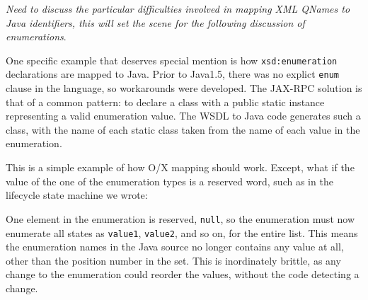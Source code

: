 \emph{Need to discuss the particular difficulties involved in mapping
XML QNames to Java identifiers, this will set the scene for the
following discussion of enumerations}.

One specific example that deserves special mention is how
\verb$xsd:enumeration$ declarations are mapped to Java. Prior to
Java1.5, there was no explict \verb$enum$ clause in the language, so
workarounds were developed. The JAX-RPC solution is that of a common
pattern: to declare a class with a public static instance representing
a valid enumeration value. The WSDL to Java code generates such a
class, with the name of each static class taken from the name of each
value in the enumeration.

This is a simple example of how O/X mapping should work. Except, what if the
value of the one of the enumeration types is a reserved word, such as in the
lifecycle state machine we wrote:



One element in the enumeration is reserved, \verb|null|, so the
enumeration must now enumerate all states as \verb|value1|,
\verb|value2|, and so on, for the entire list. This means the
enumeration names in the Java source no longer contains any value at
all, other than the position number in the set. This is inordinately
brittle, as any change to the enumeration could reorder the values,
without the code detecting a change.

% 
% 
% 
% 

